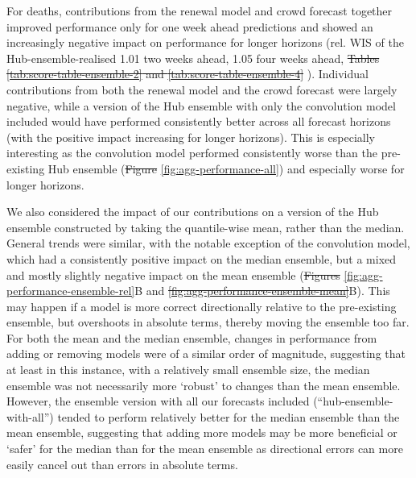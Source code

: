 \documentclass[10pt,letterpaper]{article}
\providecommand{\DIFaddtex}[1]{{\protect\color{blue}\uwave{#1}}} %
\providecommand{\DIFdeltex}[1]{{\protect\color{red}\sout{#1}}}                      %
\providecommand{\DIFaddbegin}{} %
\providecommand{\DIFaddend}{} %
\providecommand{\DIFdelbegin}{} %
\providecommand{\DIFdelend}{} %
\providecommand{\DIFadd}[1]{\texorpdfstring{\DIFaddtex{#1}}{#1}} %
\providecommand{\DIFdel}[1]{\texorpdfstring{\DIFdeltex{#1}}{}} %
\newcommand{\DIFscaledelfig}{0.5}
\newlength{\DIFdelgraphicswidth} %
\newlength{\DIFdelgraphicsheight} %
\newcommand{\DIFaddincludegraphics}[2][]{{\color{blue}\fbox{\DIFOincludegraphics[#1]{#2}}}} %
\newcommand{\DIFdelincludegraphics}[2][]{%
\sbox{\DIFdelgraphicsbox}{\DIFOincludegraphics[#1]{#2}}%
\settoboxwidth{\DIFdelgraphicswidth}{\DIFdelgraphicsbox} %
\settoboxtotalheight{\DIFdelgraphicsheight}{\DIFdelgraphicsbox} %
\scalebox{\DIFscaledelfig}{%
\parbox[b]{\DIFdelgraphicswidth}{\usebox{\DIFdelgraphicsbox}\\[-\baselineskip] \rule{\DIFdelgraphicswidth}{0em}}\llap{\resizebox{\DIFdelgraphicswidth}{\DIFdelgraphicsheight}{%
\setlength{\unitlength}{\DIFdelgraphicswidth}%
\begin{picture}(1,1)%
\thicklines\linethickness{2pt} %
{\color[rgb]{1,0,0}\put(0,0){\framebox(1,1){}}}%
{\color[rgb]{1,0,0}\put(0,0){\line( 1,1){1}}}%
{\color[rgb]{1,0,0}\put(0,1){\line(1,-1){1}}}%
\end{picture}%
}\hspace*{3pt}}} %
} %
\DeclareRobustCommand{\DIFaddbegin}{\DIFOaddbegin \let\includegraphics\DIFaddincludegraphics} %
\DeclareRobustCommand{\DIFaddend}{\DIFOaddend \let\includegraphics\DIFOincludegraphics} %
\DeclareRobustCommand{\DIFdelbegin}{\DIFOdelbegin \let\includegraphics\DIFdelincludegraphics} %
\DeclareRobustCommand{\DIFdelend}{\DIFOaddend \let\includegraphics\DIFOincludegraphics} %
\begin{document}
For deaths, contributions from the renewal model and crowd forecast
together improved performance only for one week ahead predictions and
showed an increasingly negative impact on performance for longer
horizons (rel. WIS of the Hub-ensemble-realised 1.01 two weeks ahead,
1.05 four weeks ahead, \DIFdelbegin \DIFdel{Tables \ref{tab:score-table-ensemble-2} and
\ref{tab:score-table-ensemble-4}}\DIFdelend \DIFaddbegin {} \DIFadd{and
}\DIFadd{s}\DIFaddend ). Individual contributions from
both the renewal model and the crowd forecast were largely negative,
while a version of the Hub ensemble with only the convolution model
included would have performed consistently better across all forecast
horizons (with the positive impact increasing for longer horizons). This
is especially interesting as the convolution model performed
consistently worse than the pre-existing Hub ensemble (\DIFdelbegin \DIFdel{Figure
}\DIFdelend \DIFaddbegin \DIFadd{Fig
}\DIFaddend \ref{fig:agg-performance-all}) and especially worse for longer horizons.

We also considered the impact of our contributions on a version of the
Hub ensemble constructed by taking the quantile-wise mean, rather than
the median. General trends were similar, with the notable exception of
the convolution model, which had a consistently positive impact on the
median ensemble, but a mixed and mostly slightly negative impact on the
mean ensemble (\DIFdelbegin \DIFdel{Figures }\DIFdelend \DIFaddbegin \DIFadd{Figs }\DIFaddend \ref{fig:agg-performance-ensemble-rel}B and
\DIFdelbegin \DIFdel{\ref{fig:agg-performance-ensemble-mean}}\DIFdelend \DIFaddbegin {}\DIFaddend B). This may happen if a
model is more correct directionally relative to the pre-existing
ensemble, but overshoots in absolute terms, thereby moving the ensemble
too far. For both the mean and the median ensemble, changes in
performance from adding or removing models were of a similar order of
magnitude, suggesting that at least in this instance, with a relatively
small ensemble size, the median ensemble was not necessarily more
`robust' to changes than the mean ensemble. However, the ensemble
version with all our forecasts included (``hub-ensemble-with-all'')
tended to perform relatively better for the median ensemble than the
mean ensemble, suggesting that adding more models may be more beneficial
or `safer' for the median than for the mean ensemble as directional
errors can more easily cancel out than errors in absolute terms.
\end{document}
